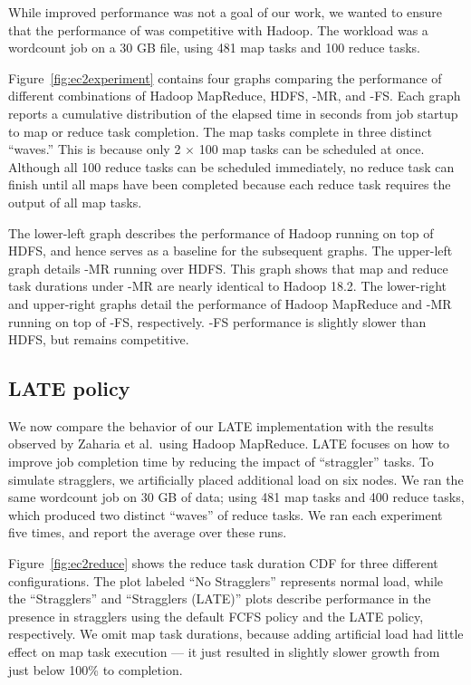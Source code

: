 While improved performance was not a goal of our work, we wanted to ensure that
the performance of \BOOMA was competitive with Hadoop.  The workload was a
wordcount job on a 30 GB file, using 481 map tasks and 100 reduce tasks.

Figure~\ref{fig:ec2experiment} contains four graphs comparing the performance of
different combinations of Hadoop MapReduce, HDFS, \BOOM-MR, and \BOOM-FS\@. Each
graph reports a cumulative distribution of the elapsed time in seconds from job
startup to map or reduce task completion. The map tasks complete in three
distinct ``waves.'' This is because only 2 $\times$ 100 map tasks can be
scheduled at once. Although all 100 reduce tasks can be scheduled immediately,
no reduce task can finish until all maps have been completed because each reduce
task requires the output of all map tasks.

The lower-left graph describes the performance of Hadoop running on top of HDFS,
and hence serves as a baseline for the subsequent graphs. The upper-left graph
details \BOOM-MR running over HDFS\@. This graph shows that map and reduce task
durations under \BOOM-MR are nearly identical to Hadoop 18.2. The lower-right
and upper-right graphs detail the performance of Hadoop MapReduce and \BOOM-MR
running on top of \BOOM-FS, respectively. \BOOM-FS performance is slightly
slower than HDFS, but remains competitive.


\subsection{LATE policy}

We now compare the behavior of our LATE implementation with the results
observed by Zaharia et al.\ using Hadoop MapReduce.  LATE focuses on how to
improve job completion time by reducing the impact of ``straggler'' tasks.  To
simulate stragglers, we artificially placed additional load on six nodes.  We
ran the same wordcount job on 30 GB of data; using 481 map tasks and 400 reduce
tasks, which produced two distinct ``waves'' of reduce tasks.  We ran each
experiment five times, and report the average over these runs.

Figure~\ref{fig:ec2reduce} shows the reduce task duration CDF for three
different configurations.  The plot labeled ``No Stragglers'' represents normal
load, while the ``Stragglers'' and ``Stragglers (LATE)'' plots describe
performance in the presence in stragglers using the default FCFS policy and the
LATE policy, respectively.  We omit map task durations, because adding
artificial load had little effect on map task execution --- it just resulted in
slightly slower growth from just below 100\% to completion.

